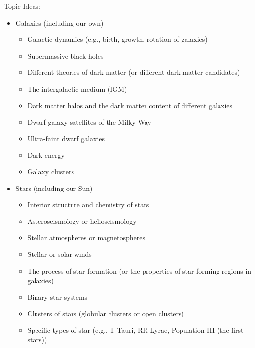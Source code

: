 \documentclass[12pt]{article}
\begin{document}
\medskip \noindent
Topic Ideas:
\begin{itemize}[noitemsep]
    \item Galaxies (including our own)
        \begin{itemize}[noitemsep]
            \item Galactic dynamics (e.g., birth, growth, rotation of galaxies)
            \item Supermassive black holes
            \item Different theories of dark matter (or different dark matter candidates)
            \item The intergalactic medium (IGM)
            \item Dark matter halos and the dark matter content of different galaxies
            \item Dwarf galaxy satellites of the Milky Way
            \item Ultra-faint dwarf galaxies
            \item Dark energy
            \item Galaxy clusters
        \end{itemize}

    \item Stars (including our Sun)
        \begin{itemize}[noitemsep]
            \item Interior structure and chemistry of stars
            \item Asteroseismology or helioseismology 
            \item Stellar atmospheres or magnetospheres
            \item Stellar or solar winds
            \item The process of star formation (or the properties of star-forming regions in galaxies)
            \item Binary star systems
            \item Clusters of stars (globular clusters or open clusters)
            \item Specific types of star (e.g., T Tauri, RR Lyrae, Population III (the first stars))
        \end{itemize}


\end{itemize}
\end{document}
